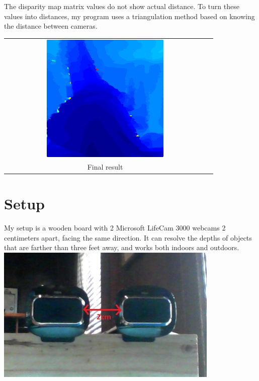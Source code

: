 \documentclass[11pt,fleqn]{article}
\begin{document}
The disparity map matrix values do not show actual distance. To turn these values into distances, my program uses a triangulation method based on knowing the distance between cameras.
\begin{center}
\begin{tabular}{cc}
\includegraphics[width=0.6\textwidth]{images/withmedianfilter.png}\\
Final result
\end{tabular}
\end{center}

\section{Setup}
My setup is a wooden board with 2 Microsoft LifeCam 3000 webcams 2 centimeters apart, facing the same direction. It can resolve the depths of objects that are farther than three feet away, and works both indoors and outdoors.\\[2pt]

\includegraphics[width=0.8\textwidth]{images/setup.jpg}
\end{document}
